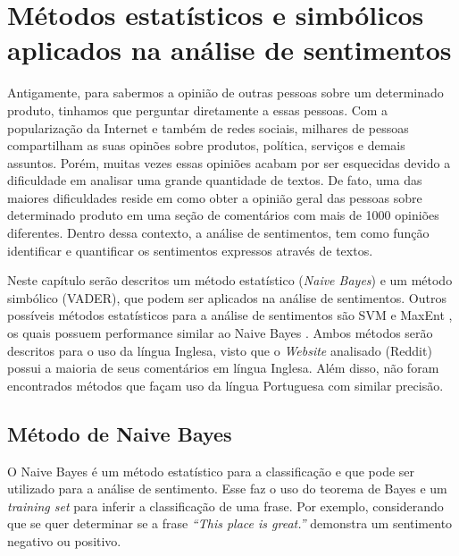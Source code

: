 \chapter{Métodos estatísticos e simbólicos aplicados na análise de sentimentos}
\label{cap:Classificadores}

Antigamente, para sabermos a opinião de outras pessoas sobre um
determinado produto, tinhamos que perguntar diretamente a essas pessoas. Com a
popularização da Internet e também de redes sociais, milhares de pessoas
compartilham as suas opinões sobre produtos, política, serviços e
demais assuntos. Porém, muitas vezes essas opiniões acabam
por ser esquecidas devido a dificuldade em analisar uma grande quantidade de
textos. De fato, uma das maiores dificuldades reside em como obter a opinião
geral das pessoas sobre determinado produto em uma seção de comentários com mais
de 1000 opiniões diferentes. Dentro dessa contexto, a análise de sentimentos,
tem como função identificar e quantificar os sentimentos expressos através de
textos.

Neste capítulo serão descritos um método estatístico (\textit{Naive Bayes}) e um
método simbólico (\ac{VADER}), que podem ser aplicados na análise de sentimentos.
Outros possíveis métodos estatísticos para a análise de sentimentos são \ac{SVM}
\cite{Hearst:1998:SVM:630302.630387} e \ac{MaxEnt}
\cite{Berger:1996:MEA:234285.234289}, os quais possuem performance similar ao Naive Bayes \cite{Pang:2002:TUS:1118693.1118704}. Ambos métodos serão descritos para o uso da língua Inglesa, visto que o \textit{Website} analisado (Reddit) possui a maioria de seus
comentários em língua Inglesa. Além disso, não foram encontrados métodos que
façam uso da língua Portuguesa com similar precisão.





\section{Método de Naive Bayes}

O Naive Bayes é um método estatístico para a classificação e que pode ser
utilizado para a análise de sentimento. Esse faz o uso do teorema de Bayes e um
\textit{training set} para inferir a classificação de uma frase. Por exemplo,
considerando que se quer determinar se a frase \textit{``This place is
great.''} demonstra um sentimento negativo ou positivo.


